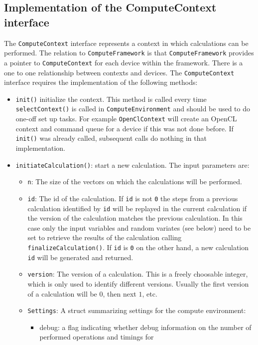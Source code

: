 \documentclass[12pt, a4paper]{article}
\begin{document}
\subsection{Implementation of the ComputeContext interface}\label{implComputeContext}

The \verb+ComputeContext+ interface represents a context in which calculations can be performed. The relation to
\verb+ComputeFramework+ is that \verb+ComputeFramework+ provides a pointer to \verb+ComputeContext+ for each device
within the framework. There is a one to one relationship between contexts and devices. The \verb+ComputeContext+
interface requires the implementation of the following methods:

\begin{itemize}
\item \verb+init()+ initialize the context. This method is called every time \verb+selectContext()+ is called in
  \verb+ComputeEnvironment+ and should be used to do one-off set up tasks. For example \verb+OpenClContext+ will create
  an OpenCL context and command queue for a device if this was not done before. If \verb+init()+ was already called,
  subsequent calls do nothing in that implementation.
\item \verb+initiateCalculation()+: start a new calculation. The input parameters are:
  \begin{itemize}
  \item \verb+n+: The size of the vectors on which the calculations will be performed.
  \item \verb+id+: The id of the calculation. If \verb+id+ is not \verb+0+ the steps from a previous calculation
    identified by \verb+id+ will be replayed in the current calculation if the version of the calculation matches the
    previous calculation. In this case only the input variables and random variates (see below) need to be set to
    retrieve the results of the calculation calling \verb+finalizeCalculation()+. If \verb+id+ is \verb+0+ on the other
    hand, a new calculation \verb+id+ will be generated and returned.
  \item \verb+version+: The version of a calculation. This is a freely choosable integer, which is only used to identify
    different versions. Usually the first version of a calculation will be $0$, then next $1$, etc.
  \item \verb+Settings+: A struct summarizing settings for the compute environment:
    \begin{itemize}
      \item debug: a flag indicating whether debug information on the number of performed operations and timings for

\end{itemize}
\end{itemize}
\end{itemize}
\end{document}
